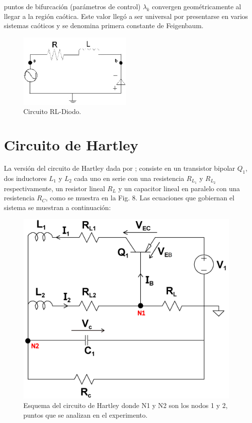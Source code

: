 \documentclass{article}
\begin{document}
puntos de bifurcación (parámetros de control) $\lambda_k$ convergen geométricamente al llegar a la región caótica. Este valor llegó a ser universal por presentarse en varios sistemas caóticos y se denomina primera constante de Feigenbaum.

    \begin{figure}
        \centering
        \includegraphics[width=0.5\textwidth]{RLDiodo/RLDIODO.png}
        \caption{Circuito RL-Diodo.}
        \label{fig:my_label}
    \end{figure}




\section{Circuito de Hartley}
La versión del circuito de \mbox{Hartley} dada por  \cite{kvarda};  consiste en un transistor bipolar $Q_1$, dos inductores $L_1$ y $L_2$ cada uno en serie con una resistencia $R_{L_1}$ y $R_{L_2}$ respectivamente, un resistor \mbox{lineal} $R_{L}$ y un capacitor lineal en paralelo  con una resistencia $R_C$, como se muestra en la Fig. 8. Las ecuaciones  que gobiernan  el sistema se muestran a continuación:

\begin{figure}
\centering
\includegraphics[scale=0.12]{Hartley/circuito hartley.png}
\caption{\label{fig2}Esquema del circuito de Hartley donde N1 y N2 son los nodos 1 y 2, puntos que se analizan en el experimento.}
\end{figure}
\end{document}
